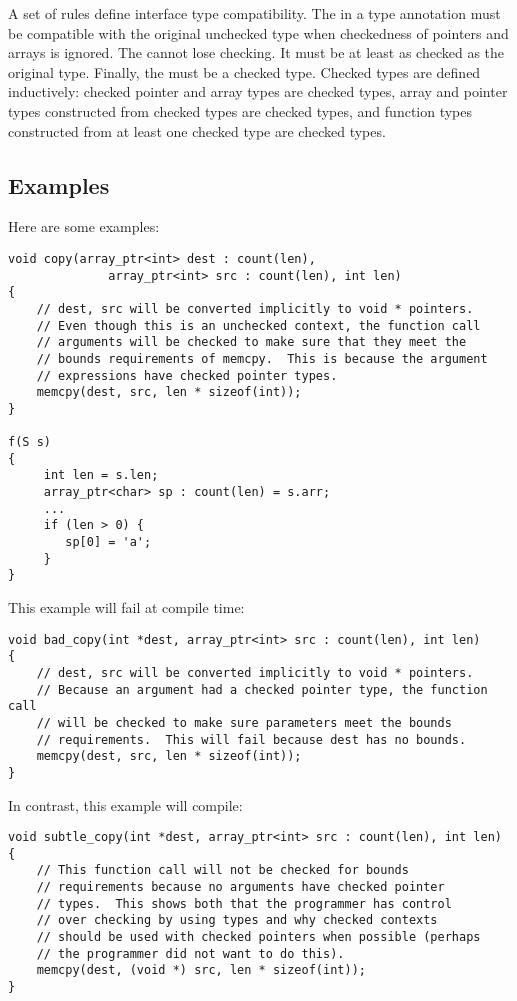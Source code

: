 A set of rules define interface type compatibility.
The  in a type annotation must be compatible
with the original unchecked type when checkedness
of pointers and arrays is ignored. The  cannot
lose checking.  It must be at least as checked as the
original type.  Finally, the  must be
a checked type.   Checked types are defined inductively:
checked pointer and array types are checked types,
array and pointer types constructed from checked types
are checked types, and function types constructed from
at least one checked type are checked types.


\subsection{Examples}
\label{section:bounds-safe-interface-examples}

Here are some examples:
\begin{lstlisting}
void copy(array_ptr<int> dest : count(len),
              array_ptr<int> src : count(len), int len)
{
    // dest, src will be converted implicitly to void * pointers.
    // Even though this is an unchecked context, the function call
    // arguments will be checked to make sure that they meet the
    // bounds requirements of memcpy.  This is because the argument
    // expressions have checked pointer types.
    memcpy(dest, src, len * sizeof(int));
}

f(S s) 
{
     int len = s.len;
     array_ptr<char> sp : count(len) = s.arr;
     ...
     if (len > 0) {
        sp[0] = 'a';
     }
}
\end{lstlisting}

This example will fail at compile time:
\begin{lstlisting}
void bad_copy(int *dest, array_ptr<int> src : count(len), int len)
{
    // dest, src will be converted implicitly to void * pointers.
    // Because an argument had a checked pointer type, the function call
    // will be checked to make sure parameters meet the bounds
    // requirements.  This will fail because dest has no bounds.
    memcpy(dest, src, len * sizeof(int));
}
\end{lstlisting}

In contrast, this example will compile:
\begin{lstlisting}
void subtle_copy(int *dest, array_ptr<int> src : count(len), int len)
{
    // This function call will not be checked for bounds
    // requirements because no arguments have checked pointer
    // types.  This shows both that the programmer has control
    // over checking by using types and why checked contexts
    // should be used with checked pointers when possible (perhaps
    // the programmer did not want to do this).
    memcpy(dest, (void *) src, len * sizeof(int));
}
\end{lstlisting}

